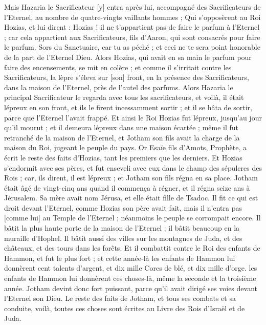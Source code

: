 \begin{multicols}{2}
Mais Hazaria le Sacrificateur [y] entra après lui, accompagné des Sacrificateurs de l'Eternel, au nombre de quatre-vingts vaillants hommes ;
Qui s'opposèrent au Roi Hozias, et lui dirent : Hozias ! il ne t'appartient pas de faire le parfum à l'Eternel ; car cela appartient aux Sacrificateurs, fils d'Aaron, qui sont consacrés pour faire le parfum. Sors du Sanctuaire, car tu as péché ; et ceci ne te sera point honorable de la part de l'Eternel Dieu.
Alors Hozias, qui avait en sa main le parfum pour faire des encensements, se mit en colère ; et comme il s'irritait contre les Sacrificateurs, la lèpre s'éleva sur [son] front, en la présence des Sacrificateurs, dans la maison de l'Eternel, près de l'autel des parfums.
Alors Hazaria le principal Sacrificateur le regarda avec tous les sacrificateurs, et voilà, il était lépreux en son front, et ils le firent incessamment sortir ; et il se hâta de sortir, parce que l'Eternel l'avait frappé.
Et ainsi le Roi Hozias fut lépreux, jusqu'au jour qu'il mourut ; et il demeura lépreux dans une maison écartée ; même il fut retranché de la maison de l'Eternel, et Jotham son fils avait la charge de la maison du Roi, jugeant le peuple du pays.
Or Esaïe fils d'Amots, Prophète, a écrit le reste des faits d'Hozias, tant les premiers que les derniers.
Et Hozias s'endormit avec ses pères, et fut enseveli avec eux dans le champ des sépulcres des Rois ; car, ils dirent, il est lépreux ; et Jotham son fils régna en sa place.
\VerseOne{}Jotham était âgé de vingt-cinq ans quand il commença à régner, et il régna seize ans à Jérusalem. Sa mère avait nom Jérusa, et elle était fille de Tsadoc.
Il fit ce qui est droit devant l'Eternel, comme Hozias son père avait fait, mais il n'entra pas [comme lui] au Temple de l'Eternel ; néanmoins le peuple se corrompait encore.
Il bâtit la plus haute porte de la maison de l'Eternel ; il bâtit beaucoup en la muraille d'Hophel.
Il bâtit aussi des villes sur les montagnes de Juda, et des châteaux, et des tours dans les forêts.
Et il combattit contre le Roi des enfants de Hammon, et fut le plus fort ; et cette année-là les enfants de Hammon lui donnèrent cent talents d'argent, et dix mille Cores de blé, et dix mille d'orge. les enfants de Hammon lui donnèrent ces choses-là, même la seconde et la troisième année.
Jotham devint donc fort puissant, parce qu'il avait dirigé ses voies devant l'Eternel son Dieu.
Le reste des faits de Jotham, et tous ses combats et sa conduite, voilà, toutes ces choses sont écrites au Livre des Rois d'Israël et de Juda.

\end{multicols}
